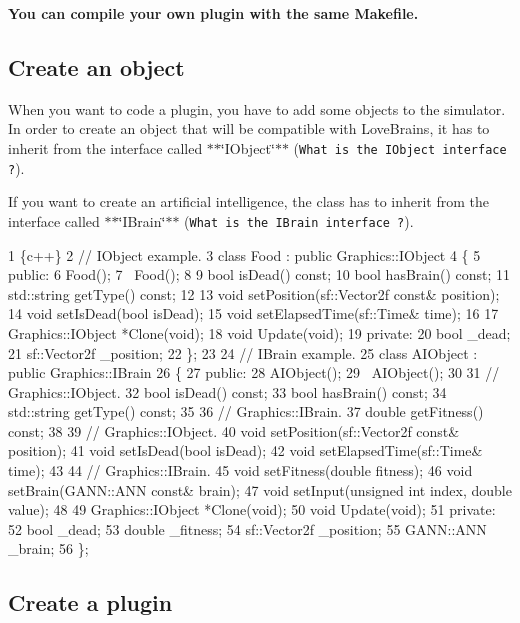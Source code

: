 {\bfseries You can compile your own plugin with the same Makefile.}

\subsection*{Create an object}

When you want to code a plugin, you have to add some objects to the simulator. In order to create an object that will be compatible with Love\+Brains, it has to inherit from the interface called $\ast$$\ast$\char`\"{}\+I\+Object\char`\"{}$\ast$$\ast$ ({\tt What is the I\+Object interface ?}).

If you want to create an artificial intelligence, the class has to inherit from the interface called $\ast$$\ast$\char`\"{}\+I\+Brain\char`\"{}$\ast$$\ast$ ({\tt What is the I\+Brain interface ?}).


\begin{DoxyCode}
1 \{c++\}
2 // IObject example.
3 class Food : public Graphics::IObject
4 \{
5     public:
6         Food();
7         ~Food();
8 
9         bool isDead() const;
10         bool hasBrain() const;
11         std::string getType() const;
12 
13         void setPosition(sf::Vector2f const& position);
14         void setIsDead(bool isDead);
15         void setElapsedTime(sf::Time& time);
16 
17         Graphics::IObject *Clone(void);
18         void Update(void);
19     private:
20         bool \_dead;
21         sf::Vector2f \_position;
22 \};
23 
24 // IBrain example.
25 class AIObject : public Graphics::IBrain
26 \{
27     public:
28         AIObject();
29         ~AIObject();
30 
31         // Graphics::IObject.
32         bool isDead() const;
33         bool hasBrain() const;
34         std::string getType() const;
35 
36         // Graphics::IBrain.
37         double getFitness() const;
38 
39         // Graphics::IObject.
40         void setPosition(sf::Vector2f const& position);
41         void setIsDead(bool isDead);
42         void setElapsedTime(sf::Time& time);
43 
44         // Graphics::IBrain.
45         void setFitness(double fitness);
46         void setBrain(GANN::ANN const& brain);
47         void setInput(unsigned int index, double value);
48 
49         Graphics::IObject *Clone(void);
50         void Update(void);
51     private:
52         bool \_dead;
53         double \_fitness;
54         sf::Vector2f \_position;
55         GANN::ANN \_brain;
56 \};
\end{DoxyCode}


\subsection*{Create a plugin}

